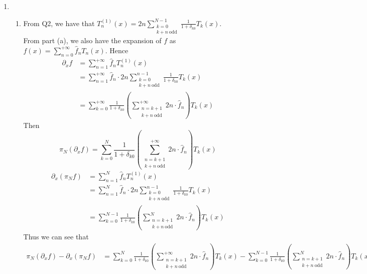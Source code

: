 \documentclass[a4paper,8pt]{article}
\begin{document}
\newpage
\begin{enumerate}[label=Q\arabic	*.]
\setlength{\itemsep}{0pt}
\setcounter{enumi}{2}
\item 
\begin{enumerate}[label=(\alph*)]
\setlength{\itemsep}{0pt}
\setcounter{enumii}{2}
\item From Q2, we have that $T^{(1)}_{n} (x) = 2 n \sum\limits^{N-1}_{\substack{k = 0 \\ k + n \ \text{odd}}} \frac{1}{1 + \delta_{k0}} T_k(x)$.\\
From part (a), we also have the expansion of $f$ as $f(x) = \sum\limits_{n = 0}^{+ \infty} \hat{f}_n T_n(x)$. Hence
\begin{align}
\partial_x f &= \sum\limits_{n=1}^{+ \infty} \hat{f}_n T^{(1)}_n(x) \nonumber \\	
&= \sum\limits_{n=1}^{+ \infty} \hat{f}_n \cdot 2 n \sum\limits^{n-1}_{\substack{k = 0 \\ k + n \ \text{odd}}} \frac{1}{1 + \delta_{k0}} T_k(x) \nonumber \\
&= \sum\limits_{k=0}^{+\infty} \frac{1}{1 + \delta_{k0}} \left(\sum\limits^{+\infty}_{\substack{n = k+1 \\ k + n \ \text{odd}}} 2n \cdot \hat{f}_n \right) T_k(x) \nonumber
\end{align}
Then 
\begin{equation}
\pi_N(\partial_x f) = \sum\limits_{k=0}^{N} \frac{1}{1 + \delta_{k0}} \left(\sum\limits^{+\infty}_{\substack{n = k+1 \\ k + n \ \text{odd}}} 2n \cdot \hat{f}_n \right) T_k(x) \nonumber
\end{equation}
\begin{align}
\partial_x(\pi_Nf) &= \sum\limits_{n=1}^N \hat{f}_n T^{(1)}_n (x) \nonumber \\
&= \sum\limits_{n=1}^N \hat{f}_n \cdot 2n \sum\limits^{n-1}_{\substack{k = 0 \\ k + n \ \text{odd}}} \frac{1}{1 + \delta_{k0}} T_k(x) \nonumber \\
&= \sum\limits^{N-1}_{k=0} \frac{1}{1 + \delta_{k0}} \left(\sum\limits^{N}_{\substack{n = k+1 \\ k + n \ \text{odd}}} 2n \cdot \hat{f}_n \right) T_k(x) \nonumber
\end{align}
Thus we can see that
\begin{align}
\pi_N(\partial_x f) - \partial_x(\pi_Nf) &= \sum\limits_{k=0}^{N} \frac{1}{1 + \delta_{k0}} \left(\sum\limits^{+\infty}_{\substack{n = k+1 \\ k + n \ \text{odd}}} 2n \cdot \hat{f}_n \right) T_k(x) - \sum\limits^{N-1}_{k=0} \frac{1}{1 + \delta_{k0}} \left(\sum\limits^{N}_{\substack{n = k+1 \\ k + n \ \text{odd}}} 2n \cdot \hat{f}_n \right) T_k(x) \nonumber \\

\end{align}
\end{enumerate}
\end{enumerate}
\end{document}
